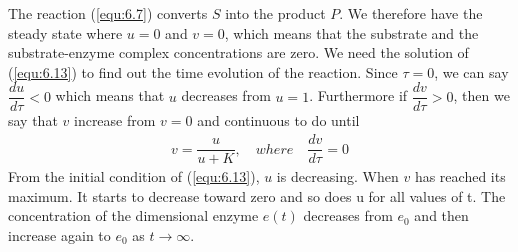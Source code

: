 \documentclass[a4paper]{report}
\theoremstyle{definition}
\begin{document}
The reaction (\ref{equ:6.7}) converts $S$ into the product $P$. We therefore have the steady state where $u=0$ and $v=0$, which means that the substrate and the substrate-enzyme complex concentrations are zero. We need the solution of (\ref{equ:6.13}) to find out the time evolution of the reaction. Since $\tau=0$, we can say $\dfrac{du}{d\tau}<0$ which means that $u$ decreases from $u=1$. Furthermore if $\dfrac{dv}{d\tau}>0$, then we say that $v$ increase from $v=0$ and continuous to do until
\begin{align}
v=\dfrac{u}{u+K}, \quad where \quad \dfrac{dv}{d\tau}=0
\end{align} 
From the initial condition of (\ref{equ:6.13}), $u$ is decreasing. When $v$ has reached its maximum. It starts to decrease toward zero and so does u for all values of t. The concentration of the dimensional enzyme $e(t)$ decreases from $e_0$ and then increase again to $e_0$ as $t\rightarrow\infty$.
\end{document}
